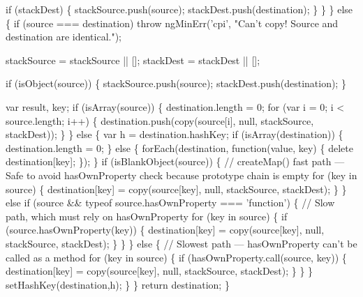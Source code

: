 \begin{DoxyCodeInclude}
      \textcolor{keywordflow}{if} (stackDest) \{
        stackSource.push(source);
        stackDest.push(destination);
      \}
    \}
  \} \textcolor{keywordflow}{else} \{
    \textcolor{keywordflow}{if} (source === destination) \textcolor{keywordflow}{throw} ngMinErr(\textcolor{stringliteral}{'cpi'},
      \textcolor{stringliteral}{"Can't copy! Source and destination are identical."});

    stackSource = stackSource || [];
    stackDest = stackDest || [];

    \textcolor{keywordflow}{if} (isObject(source)) \{
      stackSource.push(source);
      stackDest.push(destination);
    \}

    var result, key;
    \textcolor{keywordflow}{if} (isArray(source)) \{
      destination.length = 0;
      \textcolor{keywordflow}{for} (var i = 0; i < source.length; i++) \{
        destination.push(copy(source[i], null, stackSource, stackDest));
      \}
    \} \textcolor{keywordflow}{else} \{
      var h = destination.$$hashKey;
      \textcolor{keywordflow}{if} (isArray(destination)) \{
        destination.length = 0;
      \} \textcolor{keywordflow}{else} \{
        forEach(destination, \textcolor{keyword}{function}(value, key) \{
          \textcolor{keyword}{delete} destination[key];
        \});
      \}
      \textcolor{keywordflow}{if} (isBlankObject(source)) \{
        \textcolor{comment}{// createMap() fast path --- Safe to avoid hasOwnProperty check because prototype chain is empty}
        \textcolor{keywordflow}{for} (key in source) \{
          destination[key] = copy(source[key], null, stackSource, stackDest);
        \}
      \} \textcolor{keywordflow}{else} \textcolor{keywordflow}{if} (source && typeof source.hasOwnProperty === \textcolor{stringliteral}{'function'}) \{
        \textcolor{comment}{// Slow path, which must rely on hasOwnProperty}
        \textcolor{keywordflow}{for} (key in source) \{
          \textcolor{keywordflow}{if} (source.hasOwnProperty(key)) \{
            destination[key] = copy(source[key], null, stackSource, stackDest);
          \}
        \}
      \} \textcolor{keywordflow}{else} \{
        \textcolor{comment}{// Slowest path --- hasOwnProperty can't be called as a method}
        \textcolor{keywordflow}{for} (key in source) \{
          \textcolor{keywordflow}{if} (hasOwnProperty.call(source, key)) \{
            destination[key] = copy(source[key], null, stackSource, stackDest);
          \}
        \}
      \}
      setHashKey(destination,h);
    \}
  \}
  \textcolor{keywordflow}{return} destination;
\}


\end{DoxyCodeInclude}
